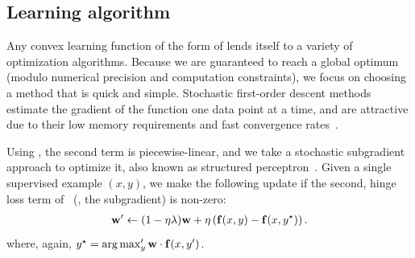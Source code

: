 \subsection{Learning algorithm}

Any convex learning function of the form of  lends itself 
to a variety of optimization algorithms.  Because we are guaranteed to reach a 
global optimum (modulo numerical precision and computation constraints), we 
focus on choosing a method that is quick and simple.  Stochastic first-order 
descent methods estimate the gradient of the function one data point at a time, 
and are attractive due to their low memory requirements and fast convergence 
rates~\citep{shalev07}.

Using , the second term is piecewise-linear, and we take a 
stochastic subgradient approach to optimize it, also known as structured 
perceptron~\citep{Collins2002}. Given a single supervised example $(x,y)$, we 
make the following update if the second, hinge loss term of~ (\ie, 
the subgradient) is non-zero:
\begin{align}
\mathbf{w}' \leftarrow (1-\eta\lambda)\mathbf{w} + \eta \left( \mathbf{f}(x,y) - \mathbf{f}(x,y^\star) \right).
\end{align}
where, again, $y^\star = \mathop{\arg\max}_y' \mathbf{w} \cdot \mathbf{f}(x,y')$.
